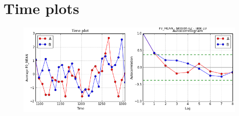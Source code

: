 \section{Time plots}

\begin{figure}
\centering
\includegraphics[width=15cm]{images/time_plot_with_autocorrelation.png}
\end{figure}

